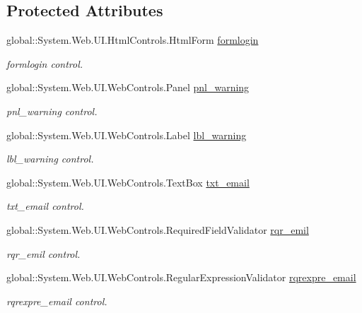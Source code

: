 \subsection*{Protected Attributes}
\begin{DoxyCompactItemize}
\item 
global\+::\+System.\+Web.\+U\+I.\+Html\+Controls.\+Html\+Form \mbox{\hyperlink{classlogin_a1d73d7512615559b12aaf3f7cf7c9a22}{formlogin}}
\begin{DoxyCompactList}\small\item\em formlogin control. \end{DoxyCompactList}\item 
global\+::\+System.\+Web.\+U\+I.\+Web\+Controls.\+Panel \mbox{\hyperlink{classlogin_aef0b43d68bab415af6ebfa69075ae14f}{pnl\+\_\+warning}}
\begin{DoxyCompactList}\small\item\em pnl\+\_\+warning control. \end{DoxyCompactList}\item 
global\+::\+System.\+Web.\+U\+I.\+Web\+Controls.\+Label \mbox{\hyperlink{classlogin_a8bb58776f29e9d995622f3217e1e1c92}{lbl\+\_\+warning}}
\begin{DoxyCompactList}\small\item\em lbl\+\_\+warning control. \end{DoxyCompactList}\item 
global\+::\+System.\+Web.\+U\+I.\+Web\+Controls.\+Text\+Box \mbox{\hyperlink{classlogin_a4b11713f4e024290de823dd5792dd7c1}{txt\+\_\+email}}
\begin{DoxyCompactList}\small\item\em txt\+\_\+email control. \end{DoxyCompactList}\item 
global\+::\+System.\+Web.\+U\+I.\+Web\+Controls.\+Required\+Field\+Validator \mbox{\hyperlink{classlogin_aae43e92283a9b1227d8359a04de1dccb}{rqr\+\_\+emil}}
\begin{DoxyCompactList}\small\item\em rqr\+\_\+emil control. \end{DoxyCompactList}\item 
global\+::\+System.\+Web.\+U\+I.\+Web\+Controls.\+Regular\+Expression\+Validator \mbox{\hyperlink{classlogin_ad92ee8bc0cc1d5af17435422a7509b39}{rqrexpre\+\_\+email}}
\begin{DoxyCompactList}\small\item\em rqrexpre\+\_\+email control. \end{DoxyCompactList}\item 

\end{DoxyCompactItemize}
